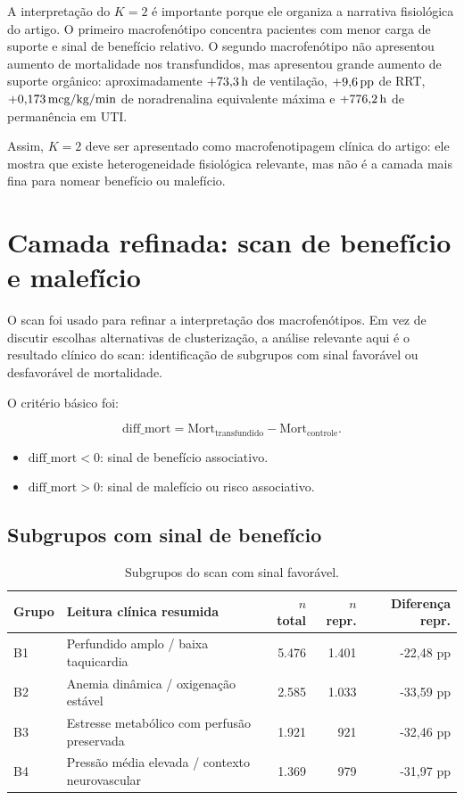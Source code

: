 A interpretação do $K=2$ é importante porque ele organiza a narrativa fisiológica do artigo. O primeiro macrofenótipo concentra pacientes com menor carga de suporte e sinal de benefício relativo. O segundo macrofenótipo não apresentou aumento de mortalidade nos transfundidos, mas apresentou grande aumento de suporte orgânico: aproximadamente $+73{,}3\,\text{h}$ de ventilação, $+9{,}6\,\text{pp}$ de RRT, $+0{,}173\,\text{mcg/kg/min}$ de noradrenalina equivalente máxima e $+776{,}2\,\text{h}$ de permanência em UTI.

\begin{boxsummary}
Assim, $K=2$ deve ser apresentado como macrofenotipagem clínica do artigo: ele mostra que existe heterogeneidade fisiológica relevante, mas não é a camada mais fina para nomear benefício ou malefício.
\end{boxsummary}

\section{Camada refinada: scan de benefício e malefício}

O scan foi usado para refinar a interpretação dos macrofenótipos. Em vez de discutir escolhas alternativas de clusterização, a análise relevante aqui é o resultado clínico do scan: identificação de subgrupos com sinal favorável ou desfavorável de mortalidade.

O critério básico foi:

\[
\text{diff\_mort}
=
\text{Mort}_{\text{transfundido}}
-
\text{Mort}_{\text{controle}}.
\]

\begin{itemize}[leftmargin=1.5em, itemsep=0.25em]
  \item $\text{diff\_mort}<0$: sinal de benefício associativo.
  \item $\text{diff\_mort}>0$: sinal de malefício ou risco associativo.
\end{itemize}

\subsection{Subgrupos com sinal de benefício}

\begin{table}[ht]
\centering
\caption{Subgrupos do scan com sinal favorável.}
\begin{tabular}{llrrr}
\toprule
Grupo & Leitura clínica resumida & $n$ total & $n$ repr. & Diferença repr. \\
\midrule
B1 & Perfundido amplo / baixa taquicardia & 5.476 & 1.401 & -22,48 pp \\
B2 & Anemia dinâmica / oxigenação estável & 2.585 & 1.033 & -33,59 pp \\
B3 & Estresse metabólico com perfusão preservada & 1.921 & 921 & -32,46 pp \\
B4 & Pressão média elevada / contexto neurovascular & 1.369 & 979 & -31,97 pp \\
\bottomrule
\end{tabular}
\end{table}

